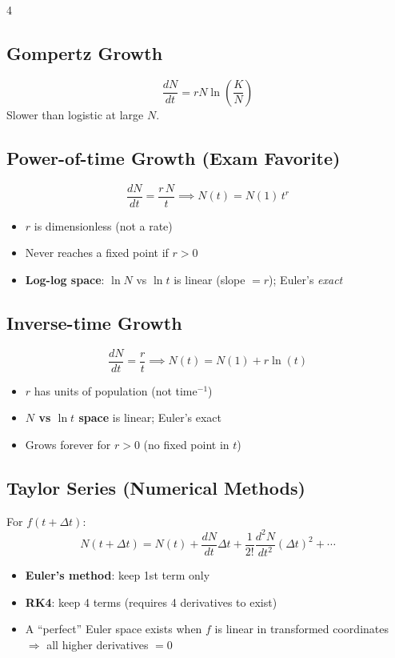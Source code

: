 \documentclass[8pt,landscape]{article}
\begin{document}
\begin{multicols}{4}
\subsection{Gompertz Growth}
\[
\frac{dN}{dt} = r N \ln\!\left(\frac{K}{N}\right)
\]
Slower than logistic at large $N$.

\subsection{Power-of-time Growth (Exam Favorite)}
\[
\frac{dN}{dt} = \frac{r\,N}{t} \implies N(t) = N(1)\,t^r
\]
\begin{itemize}
  \item $r$ is dimensionless (not a rate)
  \item Never reaches a fixed point if $r > 0$
  \item \textbf{Log-log space}: $\ln N$ vs $\ln t$ is linear (slope $= r$); Euler's \emph{exact}
\end{itemize}

\subsection{Inverse-time Growth}
\[
\frac{dN}{dt} = \frac{r}{t} \implies N(t) = N(1) + r\ln(t)
\]
\begin{itemize}
  \item $r$ has units of population (not time$^{-1}$)
  \item \textbf{$N$ vs $\ln t$ space} is linear; Euler's exact
  \item Grows forever for $r > 0$ (no fixed point in $t$)
\end{itemize}

\subsection{Taylor Series (Numerical Methods)}
For $f(t+\Delta t)$:
\[
N(t+\Delta t) = N(t) + \frac{dN}{dt}\Delta t + \frac{1}{2!}\frac{d^2N}{dt^2}(\Delta t)^2 + \cdots
\]
\begin{itemize}
  \item \textbf{Euler's method}: keep 1st term only
  \item \textbf{RK4}: keep 4 terms (requires 4 derivatives to exist)
  \item A ``perfect'' Euler space exists when $f$ is linear in transformed coordinates $\Rightarrow$ all higher derivatives $= 0$
\end{itemize}


\end{multicols}
\end{document}
